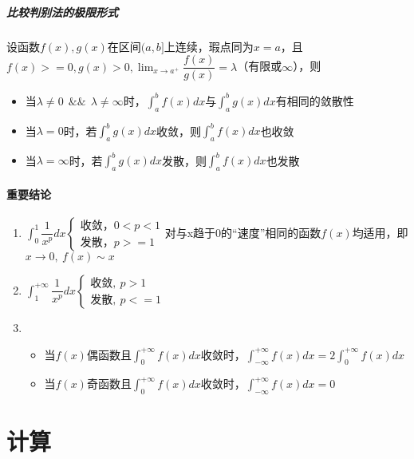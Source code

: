 \subparagraph{比较判别法的极限形式}
设函数\(f(x), g(x)\)在区间\((a, b]\)上连续，瑕点同为\(x = a\)，且\(f(x) >= 0, g(x) > 0, \displaystyle\lim_{x \to a^+}\dfrac{f(x)}{g(x)} = \lambda\)（有限或\(\infty\)），则
\begin{itemize}
    \item 当\(\lambda \neq 0\ \ \&\&\ \ \lambda \neq \infty\)时，\(\displaystyle\int_a^{b}f(x)dx\)与\(\displaystyle\int_a^{b}g(x)dx\)有相同的敛散性
    \item 当\(\lambda = 0\)时，若\(\displaystyle\int_a^{b}g(x)dx\)收敛，则\(\displaystyle\int_a^{b}f(x)dx\)也收敛
    \item 当\(\lambda = \infty\)时，若\(\displaystyle\int_a^{b}g(x)dx\)发散，则\(\displaystyle\int_a^{b}f(x)dx\)也发散
\end{itemize}


\paragraph{重要结论}

\begin{enumerate}
    \item \(\displaystyle\int_0^1\dfrac{1}{x^p}dx
    \begin{cases}
        \text{收敛，}0 < p < 1 \\ 
        \text{发散，}p >= 1
    \end{cases}\)对与x趋于0的“速度”相同的函数\(f(x)\)均适用，即\(x \to 0,\ f(x) \sim x\)
    \item \(\displaystyle\int_1^{+\infty}\dfrac{1}{x^p}dx
    \begin{cases}
        \text{收敛},\ p > 1 \\ 
        \text{发散},\ p <= 1
    \end{cases}\)
    \item \begin{itemize}
        \item 当\(f(x)\)偶函数且\(\int_0^{+\infty}f(x)dx\)收敛时，\(\displaystyle\int_{-\infty}^{+\infty}f(x)dx = 2\int_0^{+\infty}f(x)dx\)
        \item 当\(f(x)\)奇函数且\(\int_0^{+\infty}f(x)dx\)收敛时，\(\displaystyle\int_{-\infty}^{+\infty}f(x)dx = 0\)
    \end{itemize}
\end{enumerate}


\section{计算}

